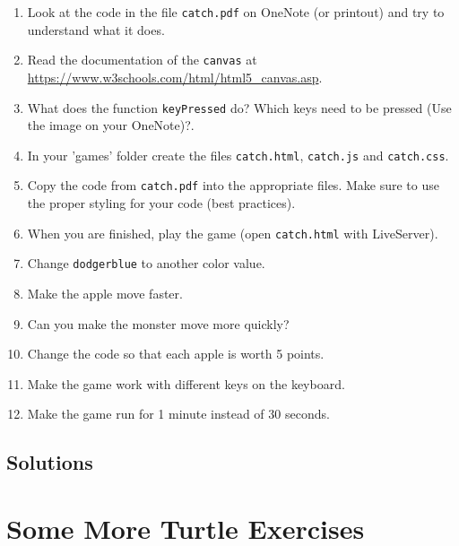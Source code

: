\documentclass[english,11pt,a4paper]{report}
\begin{document}
\begin{ex}
\begin{enumerate}
\item Look at the code in the file \verb|catch.pdf| on OneNote (or printout) and try to understand what it does.
\item Read the documentation of the \verb|canvas| at \url{https://www.w3schools.com/html/html5_canvas.asp}.
\item What does the function \verb|keyPressed| do? Which keys need to be pressed (Use the image on your OneNote)?.
\item In your 'games' folder create the files \verb|catch.html|, \verb|catch.js| and \verb|catch.css|.
\item Copy the code from \verb|catch.pdf| into the appropriate files. Make sure to use  the proper styling for your code (best practices). 
\item When you are finished, play the game (open \verb|catch.html| with LiveServer).
\item Change \verb|dodgerblue| to another color value.
\item Make the apple move faster.
\item Can you make the monster move more quickly?
\item Change the code so that each apple is worth 5 points.
\item Make the game work with different keys on the keyboard.
\item Make the game run for 1 minute instead of 30 seconds.
\end{enumerate}
\end{ex}


\newpage

\subsection*{Solutions}
\printcursols
\newpage
\section{Some More Turtle Exercises}
\end{document}
